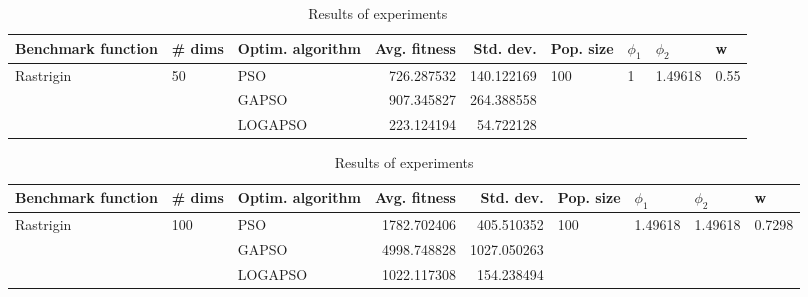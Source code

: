 \documentclass{article}
\begin{document}
\begin{table}
\centering
\caption{Results of experiments}
\begin{tabular}{lllrrllll}
\toprule
        Benchmark function &             \# dims & Optim. algorithm &  Avg. fitness &  Std. dev. &            Pop. size &         $\phi_{1}$ &               $\phi_{2}$ &                     w \\
\midrule
\multirow{3}{*}{Rastrigin} & \multirow{3}{*}{50} &              PSO &    726.287532 & 140.122169 & \multirow{3}{*}{100} & \multirow{3}{*}{1} & \multirow{3}{*}{1.49618} & \multirow{3}{*}{0.55} \\
                           &                     &            GAPSO &    907.345827 & 264.388558 &                      &                    &                          &                       \\
                           &                     &          LOGAPSO &    223.124194 &  54.722128 &                      &                    &                          &                       \\
\bottomrule
\end{tabular}
\end{table}
\begin{table}
\centering
\caption{Results of experiments}
\begin{tabular}{lllrrllll}
\toprule
        Benchmark function &              \# dims & Optim. algorithm &  Avg. fitness &   Std. dev. &            Pop. size &               $\phi_{1}$ &               $\phi_{2}$ &                       w \\
\midrule
\multirow{3}{*}{Rastrigin} & \multirow{3}{*}{100} &              PSO &   1782.702406 &  405.510352 & \multirow{3}{*}{100} & \multirow{3}{*}{1.49618} & \multirow{3}{*}{1.49618} & \multirow{3}{*}{0.7298} \\
                           &                      &            GAPSO &   4998.748828 & 1027.050263 &                      &                          &                          &                         \\
                           &                      &          LOGAPSO &   1022.117308 &  154.238494 &                      &                          &                          &                         \\
\bottomrule
\end{tabular}
\end{table}
\end{document}
